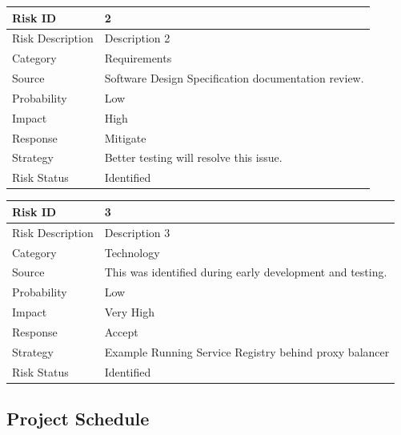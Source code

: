 \documentclass[12pt,a4paper]{article}
\begin{document}
\begin{table}[!htbp]
\begin{center}
\def\arraystretch{1.5}

\begin{tabularx}{\textwidth}{| l | X |}
\hline 
Risk ID	& 2 \\ \hline
Risk Description	& Description 2 \\ \hline
Category	& Requirements \\ \hline
Source	& Software Design Specification documentation review. \\ \hline
Probability	& Low \\ \hline
Impact	& High \\ \hline
Response	& Mitigate \\ \hline
Strategy	& Better testing will resolve this issue.  \\ \hline
Risk Status	& Identified \\ \hline
\end{tabularx}
\end{center}
\label{tab:risk2}
\end{table}

\begin{table}[!htbp]
\begin{center}
\def\arraystretch{1.5}
\begin{tabularx}{\textwidth}{| l | X |}
\hline 
Risk ID	& 3 \\ \hline
Risk Description	& Description 3 \\ \hline
Category	& Technology \\ \hline
Source	& This was identified during early development and testing. \\ \hline
Probability	& Low \\ \hline
Impact	& Very High \\ \hline
Response	& Accept \\ \hline
Strategy	& Example Running Service Registry behind proxy balancer  \\ \hline
Risk Status	& Identified \\ \hline
\end{tabularx}
\end{center}
\label{tab:risk3}
\end{table}

\subsection{Project Schedule}  
\end{document}
